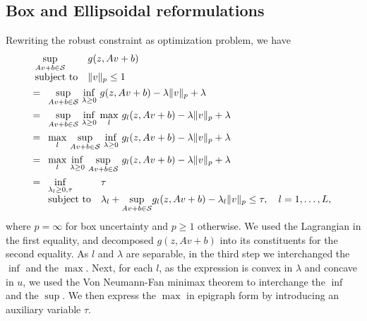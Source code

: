 \subsection{Box and Ellipsoidal reformulations}
\label{apx:boxproof}
Rewriting the robust constraint as optimization problem, we have
{\allowdisplaybreaks \begin{align*}
& \begin{array}[t]{ll}
	\underset{Av+b\in \mathcal{S}}{\sup} & g(z,Av+b) \\
	\mbox{subject to} & \|v\|_p \le 1
\end{array}\\
&= \begin{array}[t]{ll}
	\underset{Av+b\in \mathcal{S}}{\sup}  ~\underset{\lambda \geq 0}{\inf}~g(z,Av+b)  - \lambda\| v\|_p  + \lambda\\
	\end{array}\\
	&= \begin{array}[t]{ll}
	\underset{Av+b\in \mathcal{S}}{\sup} ~ \underset{\lambda \geq 0}{\inf}  ~\underset{l}{\max}~g_l(z,Av+b)  - \lambda\|v \|_p  + \lambda\\
		\end{array}\\
		&= \begin{array}[t]{ll}
			\underset{l}{\max}~ \underset{Av+b\in \mathcal{S}}{\sup} ~ \underset{\lambda \geq 0}{\inf}  ~g_l(z,Av+b)  - \lambda\| v\|_p  + \lambda\\
				\end{array}\\
			&= \begin{array}[t]{ll}
					\underset{l}{\max}~ \underset{\lambda \geq 0}{\inf} ~ \underset{Av+b\in \mathcal{S}}{\sup}~ g_l(z,Av+b)  - \lambda\| v \|_p  + \lambda\\
						\end{array}\\
&= \begin{array}[t]{ll}
	\underset{\lambda_l \geq 0, \tau}{\inf} & \tau\\
	\mbox{subject to} & \lambda_l + \underset{Av+b\in \mathcal{S}}{\sup } g_l(z,Av+b) - \lambda_l  \|v \|_p \leq \tau, \quad l = 1,\dots,L,
\end{array}
\end{align*}}
where $p = \infty$ for box uncertainty and $p \geq 1$ otherwise. We used the Lagrangian in the first equality, and decomposed $g(z,Av+b)$ into its constituents for the second equality. As $l$ and $\lambda$ are separable, in the third step we interchanged the $\inf$ and the $\max$. Next, for each $l$, as the expression is convex in $\lambda$ and concave in $u$, we used the Von Neumann-Fan minimax theorem to interchange the $\inf$ and the $\sup$. We then express the $\max$ in epigraph form by introducing an auxiliary variable $\tau$.

